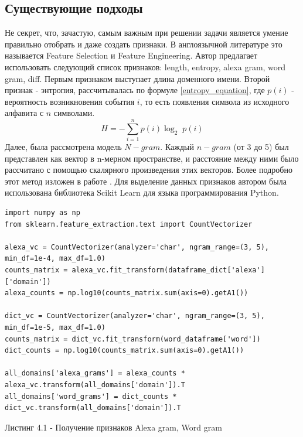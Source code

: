     \subsection{Существующие подходы}\label{be_class_exp}
    Не секрет, что, зачастую, самым важным при решении задачи является умение правильно отобрать и даже создать признаки. В англоязычной литературе это называется Feature Selection и Feature Engineering. Автор предлагает использовать следующий список признаков: length, entropy, alexa gram, word gram, diff.
    Первым признаком выступает длина доменного имени.
    Второй признак - энтропия, рассчитывалась по формуле \ref{entropy_equation}, где $p(i)$ - вероятность возникновения события $i$, то есть появления символа из исходного алфавита с $n$ символами.
    \begin{equation}\label{entropy_equation}
    H = - \sum_{i=1}^{n} p(i)\log_{2}\;p(i{})
    \end{equation}
    Далее, была рассмотрена модель $N-gram$. Каждый $n-gram$ (от 3 до 5) был представлен как вектор в n-мерном пространстве, и расстояние между ними было рассчитано с помощью скалярного произведения этих векторов. Более подробно этот метод изложен в работе \cite{Perone}.
    Для выделение данных признаков автором была использована библиотека Scikit Learn для языка программирования Python.
    \clearpage
    \begin{lstlisting}
import numpy as np
from sklearn.feature_extraction.text import CountVectorizer

alexa_vc = CountVectorizer(analyzer='char', ngram_range=(3, 5), min_df=1e-4, max_df=1.0)
counts_matrix = alexa_vc.fit_transform(dataframe_dict['alexa']['domain'])
alexa_counts = np.log10(counts_matrix.sum(axis=0).getA1())

dict_vc = CountVectorizer(analyzer='char', ngram_range=(3, 5), min_df=1e-5, max_df=1.0)
counts_matrix = dict_vc.fit_transform(word_dataframe['word'])
dict_counts = np.log10(counts_matrix.sum(axis=0).getA1())

all_domains['alexa_grams'] = alexa_counts * alexa_vc.transform(all_domains['domain']).T
all_domains['word_grams'] = dict_counts * dict_vc.transform(all_domains['domain']).T
    \end{lstlisting}
    Листинг 4.1 - Получение признаков Alexa gram, Word gram


